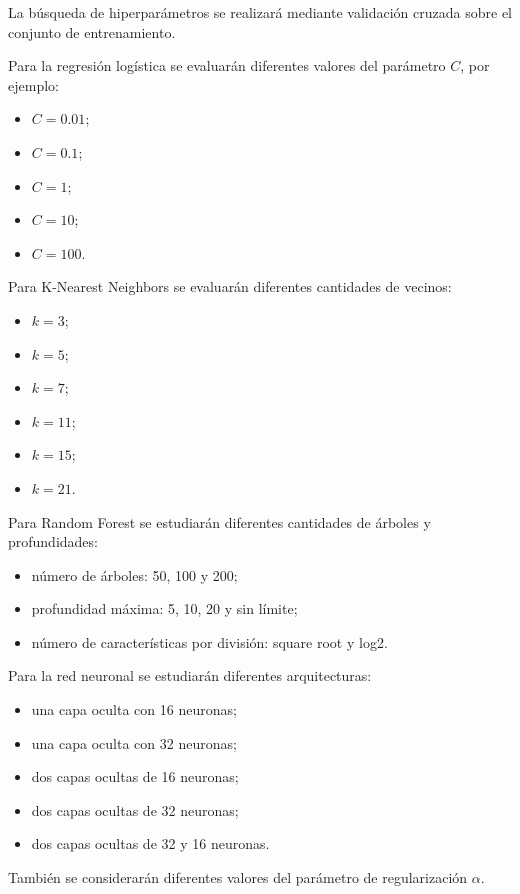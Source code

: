 \documentclass[conference]{IEEEtran}
\begin{document}
La búsqueda de hiperparámetros se realizará mediante validación cruzada sobre el conjunto de entrenamiento.

Para la regresión logística se evaluarán diferentes valores del parámetro $C$, por ejemplo:

\begin{itemize}
    \item $C=0.01$;
    \item $C=0.1$;
    \item $C=1$;
    \item $C=10$;
    \item $C=100$.
\end{itemize}

Para K-Nearest Neighbors se evaluarán diferentes cantidades de vecinos:

\begin{itemize}
    \item $k=3$;
    \item $k=5$;
    \item $k=7$;
    \item $k=11$;
    \item $k=15$;
    \item $k=21$.
\end{itemize}

Para Random Forest se estudiarán diferentes cantidades de árboles y profundidades:

\begin{itemize}
    \item número de árboles: 50, 100 y 200;
    \item profundidad máxima: 5, 10, 20 y sin límite;
    \item número de características por división: square root y log2.
\end{itemize}

Para la red neuronal se estudiarán diferentes arquitecturas:

\begin{itemize}
    \item una capa oculta con 16 neuronas;
    \item una capa oculta con 32 neuronas;
    \item dos capas ocultas de 16 neuronas;
    \item dos capas ocultas de 32 neuronas;
    \item dos capas ocultas de 32 y 16 neuronas.
\end{itemize}

También se considerarán diferentes valores del parámetro de regularización $\alpha$.
\end{document}
